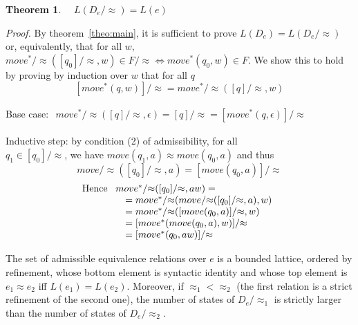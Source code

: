 \documentclass[preprint]{sigplanconf}
\newcounter{item}
\newtheorem{theorem}[item]{Theorem}
\newenvironment{proof}{\begin{trivlist}\item[]{\em Proof.}}{\end{trivlist}}
\begin{document}
\begin{theorem}
$\quad L(D_e/{\approx}) = L(e)$
\end{theorem}
\begin{proof}
By theorem~\ref{theo:main}, it is sufficient to prove
$L(D_e) = L(D_e/{\approx})$ or, equivalently, that for all $w$,
$move^*/{\approx}([q_0]/{\approx},w) \in F/{\approx} \iff
 move^*(q_0,w) \in F$. We show this to hold by proving
by induction over $w$ that for all $q$
$$[move^*(q,w)]/{\approx} = move^*/{\approx}([q]/{\approx},w)$$

\noindent
Base case:
$\begin{array}{l}
move^*/{\approx}([q]/{\approx},\epsilon) =
[q]/{\approx}
= [move^*(q,\epsilon)]/{\approx}
\end{array}
$

\noindent
Inductive step:
by condition (2) of admissibility, for all\\ $q_1 \in [q_0]/{\approx}$,
we have $move(q_1,a) \approx move(q_0,a)$ and thus
$$move/{\approx}([q_0]/{\approx},a) = [move(q_0,a)]/{\approx}$$
$$
\mbox{Hence }
\begin{array}[t]{l}
move^*/{\approx}([q_0]/{\approx},aw) =\\
\quad = move^*/{\approx}(move/{\approx}([q_0]/{\approx},a),w)\\
\quad = move^*/{\approx}([move(q_0,a)]/{\approx},w)\\
\quad = [move^*(move(q_0,a),w)]/{\approx}\\
\quad = [move^*(q_0,aw)]/{\approx}\\
\end{array}
$$
\end{proof}

The set of admissible equivalence relations over $e$ is a bounded lattice,
ordered by refinement, whose bottom element is syntactic identity and whose
top element is $e_1 \approx e_2$ iff $L(e_1) = L(e_2)$. Moreover, if
$\approx_1 < \approx_2$ (the first relation is a strict refinement of the
second one), the number of states of $D_e/{\approx_1}$ is strictly larger
than the number of states of $D_e/{\approx_2}$.
\end{document}
